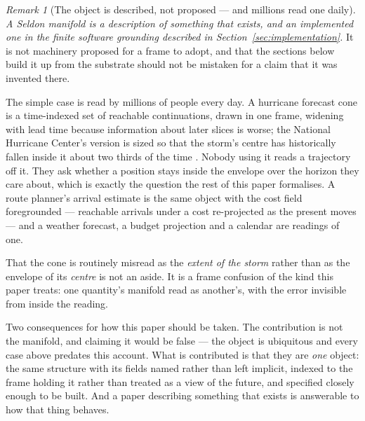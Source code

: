 \documentclass[11pt,a4paper]{article}
\theoremstyle{remark}
\newtheorem{remark}[definition]{Remark}
\begin{document}
\begin{remark}[The object is described, not proposed --- and millions read one daily]\label{rem:already-in-use}
\emph{A Seldon manifold is a description of something that exists, and an
implemented one in the finite software grounding described in Section~\ref{sec:implementation}.} It is not machinery proposed for a frame to adopt, and that the sections below
build it up from the substrate should not be mistaken for a claim that it was invented there.

The simple case is read by millions of people every day. A hurricane forecast cone is a time-indexed
set of reachable continuations, drawn in one frame, widening with lead time because information about
later slices is worse; the National Hurricane Center's version is sized so that the storm's centre has
historically fallen inside it about two thirds of the time \citep{nhccone}. Nobody using it reads a trajectory off it.
They ask whether a position stays inside the envelope over the horizon they care about, which is
exactly the question the rest of this paper formalises. A route planner's arrival estimate is the same
object with the cost field foregrounded --- reachable arrivals under a cost re-projected as the present
moves --- and a weather forecast, a budget projection and a calendar are readings of one.

That the cone is routinely misread as the \emph{extent of the storm} rather than as the envelope of its
\emph{centre} is not an aside. It is a frame confusion of the kind this paper treats: one quantity's
manifold read as another's, with the error invisible from inside the reading.

Two consequences for how this paper should be taken. The contribution is not the manifold, and claiming
it would be false --- the object is ubiquitous and every case above predates this account. What is
contributed is that they are \emph{one} object: the same structure with its fields named rather than
left implicit, indexed to the frame holding it rather than treated as a view of the future, and
specified closely enough to be built. And a paper describing something that exists is answerable to how
that thing behaves.
\end{remark}
\end{document}
